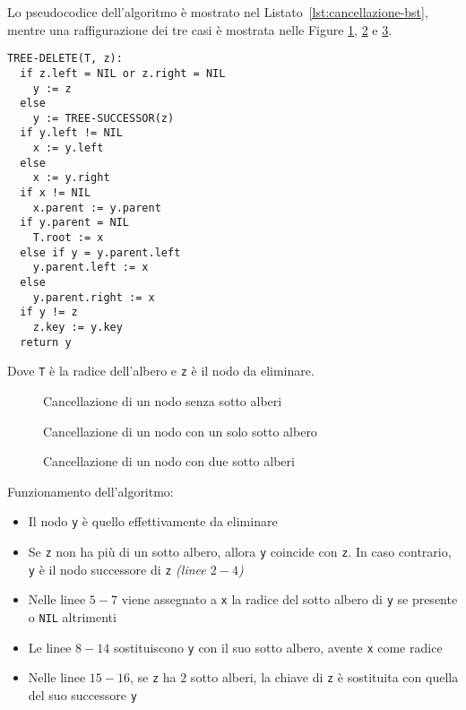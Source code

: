 \documentclass[italian, 10pt]{article}
\begin{document}
Lo pseudocodice dell'algoritmo è mostrato nel Listato~\ref{lst:cancellazione-bst}, mentre una raffigurazione dei tre casi è mostrata nelle Figure \ref{fig:cancellazione-nodo-bst-senza-sotto-alberi}, \ref{fig:cancellazione-nodo-bst-con-un-solo-sotto-albero} e \ref{fig:cancellazione-nodo-bst-con-due-sotto-alberi}.

\begin{lstlisting}[style=pseudocode, caption={Cancellazione di un nodo}, label={lst:cancellazione-bst}]
TREE-DELETE(T, z):
  if z.left = NIL or z.right = NIL
    y := z
  else
    y := TREE-SUCCESSOR(z)
  if y.left != NIL
    x := y.left
  else
    x := y.right
  if x != NIL
    x.parent := y.parent
  if y.parent = NIL
    T.root := x
  else if y = y.parent.left
    y.parent.left := x
  else
    y.parent.right := x
  if y != z
    z.key := y.key
  return y
\end{lstlisting}

Dove \texttt{T} è la radice dell'albero e \texttt{z} è il nodo da eliminare.

\begin{figure}[htbp]
  \bigskip
  \centering
  \caption{Cancellazione di un nodo senza sotto alberi}
  \label{fig:cancellazione-nodo-bst-senza-sotto-alberi}
  \bigskip
\end{figure}

\begin{figure}[htbp]
  \bigskip
  \centering
  \caption{Cancellazione di un nodo con un solo sotto albero}
  \label{fig:cancellazione-nodo-bst-con-un-solo-sotto-albero}
  \bigskip
\end{figure}

\begin{figure}[htbp]
  \bigskip
  \centering
  \caption{Cancellazione di un nodo con due sotto alberi}
  \label{fig:cancellazione-nodo-bst-con-due-sotto-alberi}
  \bigskip
\end{figure}

Funzionamento dell'algoritmo:

\begin{itemize}
  \item Il nodo \texttt{y} è quello effettivamente da eliminare
  \item Se \texttt{z} non ha più di un sotto albero, allora \texttt{y} coincide con \texttt{z}. In caso contrario, \texttt{y} è il nodo successore di \texttt{z} \textit{(linee \(2-4\))}
  \item Nelle linee \(5-7\) viene assegnato a \texttt{x} la radice del sotto albero di \texttt{y} se presente o \texttt{NIL} altrimenti
  \item Le linee \(8-14\) sostituiscono \texttt{y} con il suo sotto albero, avente \texttt{x} come radice
  \item Nelle linee \(15-16\), se \texttt{z} ha \(2\) sotto alberi, la chiave di \texttt{z} è sostituita con quella del suo successore \texttt{y}
\end{itemize}
\end{document}
